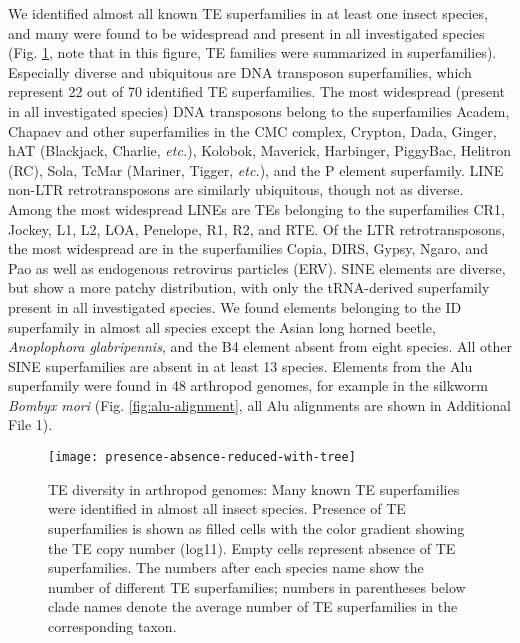 We identified almost all known TE superfamilies in at least one insect
species, and many were found to be widespread and present in all
investigated species (Fig. \ref{fig:presence-absence}, note that in this
figure, TE families were summarized in superfamilies). Especially
diverse and ubiquitous are DNA transposon superfamilies, which represent
22 out of 70 identified TE superfamilies. The most widespread (present
in all investigated species) DNA transposons belong to the superfamilies
Academ, Chapaev and other superfamilies in the CMC complex, Crypton,
Dada, Ginger, hAT (Blackjack, Charlie, \emph{etc.}), Kolobok, Maverick,
Harbinger, PiggyBac, Helitron (RC), Sola, TcMar (Mariner, Tigger,
\emph{etc.}), and the P element superfamily. LINE non-LTR
retrotransposons are similarly ubiquitous, though not as diverse. Among
the most widespread LINEs are TEs belonging to the superfamilies CR1,
Jockey, L1, L2, LOA, Penelope, R1, R2, and RTE. Of the LTR
retrotransposons, the most widespread are in the superfamilies Copia,
DIRS, Gypsy, Ngaro, and Pao as well as endogenous retrovirus particles
(ERV). SINE elements are diverse, but show a more patchy distribution,
with only the tRNA-derived superfamily present in all investigated
species. We found elements belonging to the ID superfamily in almost all
species except the Asian long horned beetle, \emph{Anoplophora
glabripennis}, and the B4 element absent from eight species. All other
SINE superfamilies are absent in at least 13 species.  Elements from the
Alu superfamily were found in 48 arthropod genomes, for example in the
silkworm \emph{Bombyx mori} (Fig. \ref{fig:alu-alignment}, all Alu
alignments are shown in Additional File 1).

\begin{figure}[h!]
\begin{center}
\texttt{[image: presence-absence-reduced-with-tree]}
\caption[TE superfamily diversity in arthropod genomes]{{TE diversity in
arthropod genomes: Many known TE superfamilies were identified in almost
all insect species. Presence of TE superfamilies is shown as filled
cells with the color gradient showing the TE copy number (log11). Empty
cells represent absence of TE superfamilies. The numbers after each
species name show the number of different TE superfamilies; numbers in
parentheses below clade names denote the average number of TE
superfamilies in the corresponding taxon.%
\label{fig:presence-absence}
}}
\end{center}
\end{figure}

